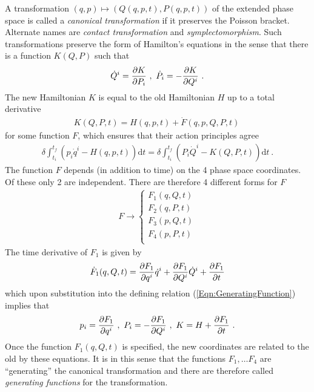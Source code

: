 \documentclass[12pt]{article}
\begin{document}
A transformation $(q,p)\mapsto (Q(q,p,t), P(q,p,t))$ of the extended phase space is called a {\em canonical transformation} if it preserves the Poisson bracket. Alternate names are {\em contact transformation} and {\em symplectomorphism}. Such transformations preserve the form of Hamilton's equations in the sense that there is a function $K(Q,P)$ such that
\begin{eqnarray}
\dot Q^i={\partial K\over \partial P_i}~,~\dot P_i=-{\partial K\over \partial Q^i}~.
\end{eqnarray}
The new Hamiltonian $K$ is equal to the old Hamiltonian $H$ up to a total derivative
\begin{eqnarray}
\label{Eqn:GeneratingFunction}
K(Q,P,t)=H(q,p,t)+\dot F(q,p,Q,P,t)~
\end{eqnarray}
for some function $F$, which ensures that their action principles agree
\begin{eqnarray}
\delta \int_{t_i}^{t_f} \left(p_i\dot q^i-H(q,p,t) \right)\mathrm dt=
\delta \int_{t_i}^{t_f} \left( P_i\dot Q^i-K(Q,P,t)\right)\mathrm dt~.
\end{eqnarray}
The function $F$ depends (in addition to time) on the 4 phase space coordinates. Of these only 2 are independent. There are therefore 4 different forms for $F$
\begin{eqnarray}
F\rightarrow \left\{    \begin{array}{c} %
      F_1(q,Q,t) \\
      F_2 (q,P,t)\\
      F_3(p,Q,t)\\
      F_4(p,P,t)\\
   \end{array}
\right.
\end{eqnarray}
The time derivative of $F_1$ is given by
\begin{eqnarray}
\dot F_1(q,Q,t)={\partial F_1\over \partial q^i}\dot q^i+{\partial F_1\over \partial Q^i}\dot Q^i+{\partial F_1\over \partial t}
\end{eqnarray}
which upon substitution into the defining relation (\ref{Eqn:GeneratingFunction}) implies that
\begin{eqnarray}
\label{Eqn:F1}
p_i={\partial F_1\over \partial q^i}~,~P_i=-{\partial F_1\over \partial Q^i}~,~K=H+{\partial F_1\over \partial t}~.
\end{eqnarray}
Once the function $F_1(q,Q,t)$ is specified, the new coordinates are related to the old by these equations. It is in this sense that the functions $F_1,\dots F_4$ are ``generating'' the canonical transformation and there are therefore called {\em generating functions} for the transformation. 
\end{document}
